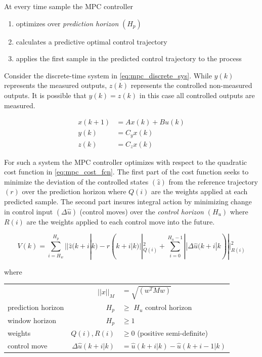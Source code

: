 At every time sample the MPC controller
\begin{enumerate}
	\item optimizes over \textit{prediction horizon} $(H_p)$
	\item calculates a predictive optimal control trajectory
	\item applies the first sample in the predicted control trajectory to the process
\end{enumerate}

\medskip

Consider the discrete-time system in \cref{eq:mpc_discrete_sys}. While $y(k)$ represents the measured outputs, $z(k)$ represents the controlled non-measured outputs. It is possible that $y(k) = z(k)$ in this case all controlled outputs are measured.

\begin{equation} \label{eq:mpc_discrete_sys}
	\begin{split}
		x(k+1) 	& = Ax(k) + Bu(k) \\
		y(k) 	& = C_yx(k) \\
		z(k) 	& = C_zx(k)
	\end{split}
\end{equation}

For such a system the MPC controller optimizes with respect to the quadratic cost function in \cref{eq:mpc_cost_fcn}. The first part of the cost function seeks to minimize the deviation of the controlled states $(\hat{z})$ from the reference trajectory $(r)$ over the prediction horizon where $Q(i)$ are the weights applied at each predicted sample. The second part insures integral action by minimizing change in control input $(\Delta \hat{u})$ (control moves) over the \textit{control horizon} $(H_u)$ where $R(i)$ are the weights applied to each control move into the future.

\begin{equation} \label{eq:mpc_cost_fcn}
	V(k) = \sum_{i=H_w}^{H_p}||\hat{z}(k+i|k) - r(k+i|k)||^2_{Q(i)} + \sum_{i=0}^{H_u-1}||\Delta \hat{u}(k+i|k)||^2_{R(i)}
\end{equation}

where

\begin{center}
	\begin{tabular}{l r l }
		                   & $||x||_M$               & $= \sqrt{\left(w^TMw\right)}$         \\
		prediction horizon & $H_p$                   & $\ge$ $H_u$ control horizon           \\
		window horizon     & $H_p$                   & $\ge 1$                               \\
		weights            & $Q(i), R(i)$            & $\ge 0$ (positive semi-definite)      \\
		control move       & $\Delta \hat{u}(k+i|k)$ & $= \hat{u}(k+i|k) - \hat{u}(k+i-1|k)$
	\end{tabular}
\end{center}

